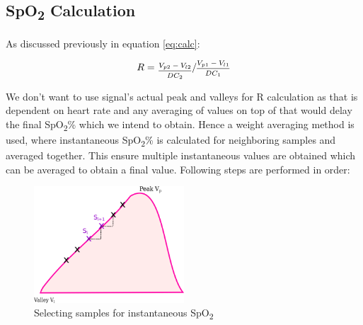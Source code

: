 	\subsection{SpO\textsubscript{2} Calculation}
		
		As discussed previously in equation \eqref{eq:calc}:
		
		
		\[
			R = \sfrac{\frac{V_{p2} - V_{l2}}{DC_2}}{\frac{V_{p1} - V_{l1}}{DC_1}}
		\]	
		
		We don't want to use signal's actual peak and valleys for R calculation as that is dependent on heart rate and any averaging of values on top of that would delay the final SpO\textsubscript{2}\% which we intend to obtain. Hence a weight averaging method is used\cite{wuk}, where instantaneous SpO\textsubscript{2}\% is calculated for neighboring samples and averaged together. This ensure multiple instantaneous values are obtained which can be averaged to obtain a final value. Following steps are performed in order:
				
		\begin{figure}[ht!]
			\centering
			\includegraphics[width=0.5\textwidth]{images/spo2_algo.png}
			\caption{Selecting samples for instantaneous SpO\textsubscript{2}}
		\end{figure}
	
